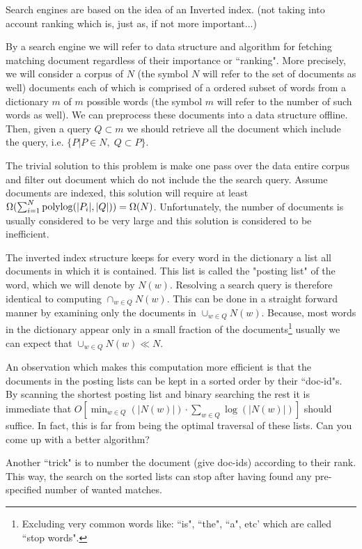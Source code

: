 \documentclass{article}
\begin{document}


Search engines are based on the idea of an Inverted index.
(not taking into account ranking which is, just as, if not more important...)


By a search engine we will refer to data structure and algorithm for fetching matching document regardless of their importance or ``ranking".
More precisely, we will consider a corpus of $N$ (the symbol $N$ will refer to the set of documents as well) 
documents each of which is comprised of a ordered subset of words from a dictionary $m$ of $m$ possible words (the symbol $m$ will refer to the number of such words as well).
We can preprocess these documents into a data structure offline. Then, given a query $Q \subset m$ we should retrieve all the document which include
the query, i.e. $\{P | P \in N , \; Q \subset P\}$.
 
The trivial solution to this problem is make one pass over the data entire corpus and filter out document which do not include the the search query.
Assume documents are indexed, this solution will require at least 
$\Omega(\sum_{i=1}^{N}{\operatorname{polylog}}(|P_i|,|Q|)) = \Omega(N)$.  
Unfortunately, the number of documents is usually considered to be very large and this solution is considered to be inefficient.  

The inverted index structure keeps for every word in the dictionary a list all documents in which it is contained.
This list is called the "posting list" of the word, which we will denote by $N(w)$.
Resolving a search query is therefore identical to computing $\cap_{w \in Q}N(w)$.
This can be done in a straight forward manner by examining only the documents in $\cup_{w \in Q}N(w)$.   
Because, most words in the dictionary appear only in a small fraction of the 
documents\footnote{Excluding very common words like: ``is", ``the", ``a", etc' which are called ``stop words".} 
usually we can expect that $\cup_{w \in Q}N(w) \ll N$.

An observation which makes this computation more efficient is that the documents in the posting lists can be kept in a
sorted order by their ``doc-id"s. By scanning the shortest posting list and binary searching the rest it is immediate that 
$O[\min_{w \in Q}(|N(w)|) \cdot \sum_{w \in Q}\log(|N(w)|)]$ should suffice. In fact, this is far from being the optimal traversal
of these lists. Can you come up with a better algorithm? 

\begin{remark}
Another ``trick" is to number the document
(give doc-ids) according to their rank. This way, the search on the sorted lists can stop after having found any pre-specified number of wanted matches. 
\end{remark}
\end{document}
